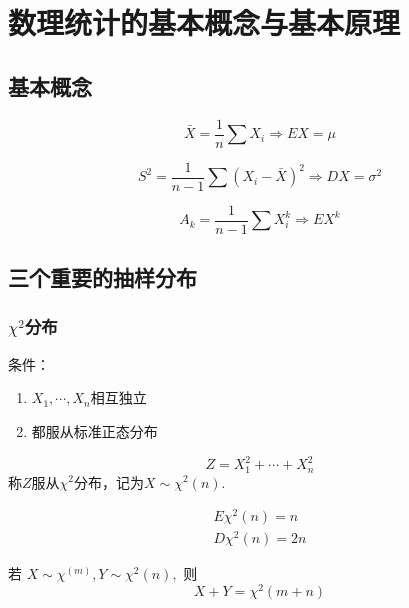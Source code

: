 \chapter{数理统计的基本概念与基本原理}

\section{基本概念}
\label{sec:基本概念}

\begin{definition}[样本均值]
    \[
        \bar{X} = \frac{1}{n} \sum X_i  \Rightarrow EX = \mu
    \]
\end{definition}

\begin{definition}[样本方差]
    \[
        S^2 = \frac{1}{n-1} \sum \left(X_i - \bar{X}\right)^2 \Rightarrow DX=\sigma^2
    \]
\end{definition}

\begin{definition}[$k$阶原点矩]
    \[
        A_k = \frac{1}{n-1} \sum X_i^k \Rightarrow EX^k
    \]
\end{definition}

\section{三个重要的抽样分布}
\label{sec:三个重要的抽样分布}

\subsection{$\chi^2$分布}
\label{sub:_chi_2_分布}

\begin{definition}[$\chi^2$分布]
    条件：
    \begin{enumerate}
        \item $X_1, \cdots, X_n$相互独立
        \item 都服从标准正态分布
    \end{enumerate}
    \[
        Z = X_1^2+ \cdots + X_n^2
    \]
    称$Z$服从$\chi^2$分布，记为$X \sim \chi^2(n).$
\end{definition}

\begin{theorem}
    \begin{align}
        E \chi^2(n) = n\\
        D \chi^2(n) = 2n
    \end{align}

    若 $X \sim \chi^(m), Y \sim \chi^2(n),$ 则
    \[
        X + Y = \chi^2(m+n)
    \]
\end{theorem}


